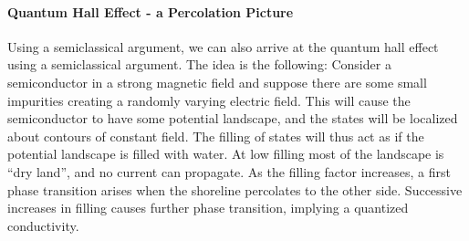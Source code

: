 \paragraph{Quantum Hall Effect - a Percolation Picture}
Using a semiclassical argument, we can also arrive at the quantum hall effect using a semiclassical argument. The idea is the following: Consider a semiconductor in a strong magnetic field and suppose there are some small impurities creating a randomly varying electric field. This will cause the semiconductor to have some potential landscape, and the states will be localized about contours of constant field. The filling of states will thus act as if the potential landscape is filled with water. At low filling most of the landscape is ``dry land'', and no current can propagate. As the filling factor increases, a first phase transition arises when the shoreline percolates to the other side. Successive increases in filling causes further phase transition, implying a quantized conductivity.